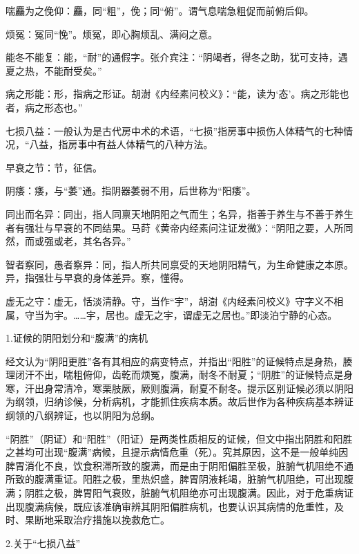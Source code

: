 \documentclass[12pt]{ctexbook}
\begin{document}

\begin{jiaozhu}
	\item 喘麤为之俛仰：麤，同“粗”，俛；同“俯”。谓气息喘急粗促而前俯后仰。
	\item 烦冤：冤同“悗”。烦冤，即心胸烦乱、满闷之意。
	\item 能冬不能复：能，“耐”的通假字。张介宾注：“阴竭者，得冬之助，犹可支持，遇夏之热，不能耐受矣。”
	\item 病之形能：形，指病之形证。胡澍《内经素问校义》：“能，读为‘态’。病之形能也者，病之形态也。”
	\item 七损八益：一般认为是古代房中术的术语，“七损”指房事中损伤人体精气的七种情况，“八益，指房事中有益人体精气的八种方法。
	\item 早衰之节：节，征信。
	\item 阴痿：痿，与“萎”通。指阴器萎弱不用，后世称为“阳痿”。
	\item 同出而名异：同出，指人同禀天地阴阳之气而生；名异，指善于养生与不善于养生者有强壮与早衰的不同结果。马莳《黄帝内经素问注证发微》：“阴阳之要，人所同然，而或强或老，其名各异。”
	\item 智者察同，愚者察异：同，指人所共同禀受的天地阴阳精气，为生命健康之本原。异，指强壮与早衰的身体差异。察，懂得。
	\item 虚无之守：虚无，恬淡清静。守，当作“宇”，胡澍《内经素问校义》守字义不相属，守当为宇。……宇，居也。虚无之宇，谓虚无之居也。”即淡泊宁静的心态。
\end{jiaozhu}


1.证候的阴阳划分和“腹满”的病机

经文认为“阴阳更胜”各有其相应的病变特点，并指出“阳胜”的证候特点是身热，腠理闭汗不出，喘粗俯仰，齿乾而烦冤，腹满，耐冬不耐夏；“阴胜”的证候特点是身寒，汗出身常清冷，寒栗肢厥，厥则腹满，耐夏不耐冬。提示区别证候必须以阴阳为纲领，归纳诊候，分析病机，才能抓住疾病本质。故后世作为各种疾病基本辨证纲领的八纲辨证，也以阴阳为总纲。

“阴胜”（阴证）和“阳胜”（阳证）是两类性质相反的证候，但文中指出阴胜和阳胜之甚均可出现“腹满”病候，且提示病情危重（死）。究其原因，这不是一般单纯因脾胃消化不良，饮食积滞所致的腹满，而是由于阴阳偏胜至极，脏腑气机阻绝不通所致的腹满重证。阳胜之极，里热炽盛，脾胃阴液耗竭，脏腑气机阻绝，可出现腹满；阴胜之极，脾胃阳气衰败，脏腑气机阻绝亦可出现腹满。因此，对于危重病证出现腹满病候，既应该准确审辨其阴阳偏胜病机，也要认识其病情的危重性，及时、果断地采取治疗措施以挽救危亡。

2.关于“七损八益”
\end{document}
